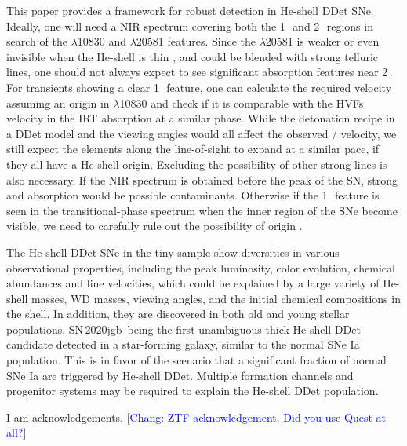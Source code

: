 \documentclass[twocolumn]{aastex631}
\newcommand{\sn}{SN\,2020jgb}
\newcommand{\chang}[1]{\textcolor{blue}{[Chang: #1]}}
\begin{document}
{This paper provides a framework for robust  detection in He-shell DDet SNe. 
Ideally, one will need a NIR spectrum covering both the 1\,\micron\ and 2\,\micron\ regions in search of the  $\lambda$10830 and $\lambda$20581 features. Since the  $\lambda$20581 is weaker or even invisible when the He-shell is thin \citep{Boyle2017_Helium}, and could be blended with strong telluric lines, one should not always expect to see significant absorption features near 2\,\micron. For transients showing a clear 1\,\micron\ feature, one can calculate the required velocity assuming an origin in  $\lambda$10830 and check if it is comparable with the HVFs velocity in the  IRT absorption at a similar phase. While the detonation recipe in a DDet model and the viewing angles would all affect the observed / velocity, we still expect the elements along the line-of-sight to expand at a similar pace, if they all have a He-shell origin. Excluding the possibility of other strong lines is also necessary. If the NIR spectrum is obtained before the peak of the SN, strong  and  absorption \citep{Hsiao_CSP_2019} would be possible contaminants. Otherwise if the 1\,\micron\ feature is seen in the transitional-phase spectrum when the inner region of the SNe become visible, we need to carefully rule out the possibility of  origin \citep{Marion2009_NIR}.

The He-shell DDet SNe in the tiny sample show diversities in various observational properties, including the peak luminosity, color evolution, chemical abundances and line velocities, which could be explained by a large variety of He-shell masses, WD masses, viewing angles, and the initial chemical compositions in the shell. In addition, they are discovered in both old and young stellar populations, \sn\ being the first unambiguous thick He-shell DDet candidate detected in a star-forming galaxy, similar to the normal SNe Ia population. This is in favor of the scenario that a significant fraction of normal SNe Ia are triggered by He-shell DDet. Multiple formation channels and progenitor systems may be required to explain the He-shell DDet population.

\begin{acknowledgements}
    I am acknowledgements. \chang{ZTF acknowledgement. Did you use Quest at all?}
\end{acknowledgements}


}
\end{document}
